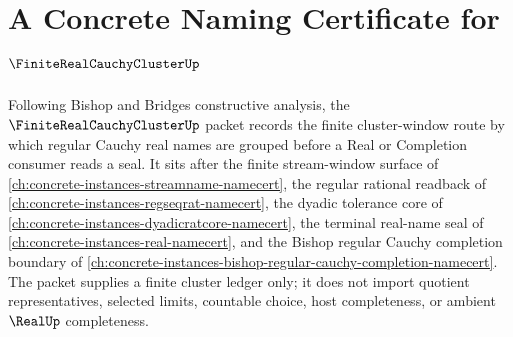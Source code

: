 \chapter{A Concrete Naming Certificate for $\FiniteRealCauchyClusterUp$}
\label{ch:concrete-instances-finite-real-cauchy-cluster-namecert}

Following Bishop and Bridges constructive analysis, the $\FiniteRealCauchyClusterUp$ packet records the finite cluster-window route by which regular Cauchy real names are grouped before a Real or Completion consumer reads a seal. It sits after the finite stream-window surface of \autoref{ch:concrete-instances-streamname-namecert}, the regular rational readback of \autoref{ch:concrete-instances-regseqrat-namecert}, the dyadic tolerance core of \autoref{ch:concrete-instances-dyadicratcore-namecert}, the terminal real-name seal of \autoref{ch:concrete-instances-real-namecert}, and the Bishop regular Cauchy completion boundary of \autoref{ch:concrete-instances-bishop-regular-cauchy-completion-namecert}. The packet supplies a finite cluster ledger only; it does not import quotient representatives, selected limits, countable choice, host completeness, or ambient $\RealUp$ completeness.

